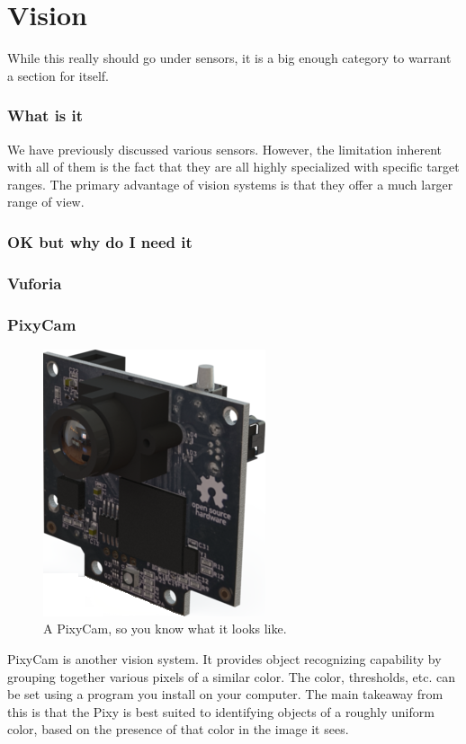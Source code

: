 \documentclass[../main.tex]{subfiles}
\begin{document}
\newpage
\part{Vision}
While this really should go under sensors, it is a big enough category to warrant a section for itself.

\section{What is it}
We have previously discussed various sensors. However, the limitation inherent with all of them is the fact that they are all highly specialized with specific target ranges. The primary advantage of vision systems is that they offer a much larger range of view.
\section{OK but why do I need it}
\section{Vuforia}
\section{PixyCam}
\begin{figure}[H]
    \centering
    \includegraphics{sections/vision/images/pixy.png}
    \caption{A PixyCam, so you know what it looks like.}
\end{figure}
PixyCam is another vision system. It provides object recognizing capability by grouping together various pixels of a similar color. The color, thresholds, etc. can be set using a program you install on your computer. The main takeaway from this is that the Pixy is best suited to identifying objects of a roughly uniform color, based on the presence of that color in the image it sees.
\end{document}
